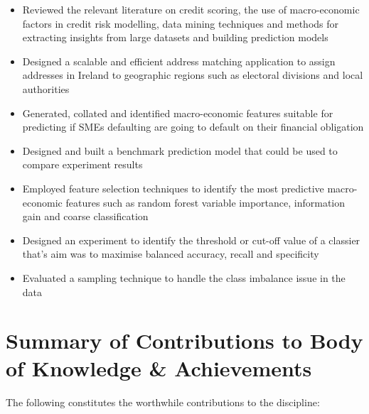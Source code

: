 \begin{itemize}
	\item Reviewed the relevant literature on credit scoring, the use of macro-economic factors in credit risk modelling, data mining techniques and methods for extracting insights from large datasets and building prediction models
	\item Designed a scalable and efficient address matching application to assign addresses in Ireland to geographic regions such as electoral divisions and local authorities
	\item Generated, collated and identified macro-economic features suitable for predicting if SMEs defaulting are going to default on their financial obligation
	\item Designed and built a benchmark prediction model that could be used to compare experiment results
	\item Employed feature selection techniques to identify the most predictive macro-economic features such as random forest variable importance, information gain and coarse classification
	\item Designed an experiment to identify the threshold or cut-off value of a classier that's aim was to maximise balanced accuracy, recall and specificity 
	\item Evaluated a sampling technique to handle the class imbalance issue in the data
\end{itemize}





\section{Summary of Contributions to Body of Knowledge \& Achievements}

The following constitutes the worthwhile contributions to the discipline:

